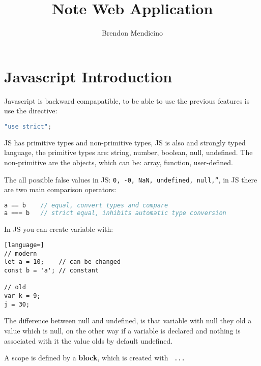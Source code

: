 \documentclass[12pt]{article}
\title{Note Web Application}
\author{Brendon Mendicino}
\begin{document}
\maketitle
\newpage
\tableofcontents
\newpage



\section{Javascript Introduction}
Javascript is backward compapatible, to be able to use the previous features is use the directive:
\begin{lstlisting}[language=javascript]
"use strict";
\end{lstlisting}
JS has primitive types and non-primitive types, JS is also and strongly typed language, the primitive types are: string, number, boolean, null, undefined. The non-primitive are the objects, which can be: array, function, user-defined.

The all possible false values in JS: \texttt{0, -0, NaN, undefined, null,''}, in JS there are two main comparison operators:
\begin{lstlisting}[language=javascript]
a == b    // equal, convert types and compare
a === b   // strict equal, inhibits automatic type conversion
\end{lstlisting}
In JS you can create variable with:
\begin{lstlisting}[language=]
// modern
let a = 10;    // can be changed
const b = 'a'; // constant

// old
var k = 9;
j = 30;
\end{lstlisting}
The difference between null and undefined, is that variable with null they old a value which is null, on the other way if a variable is declared and nothing is associated with it the value olds by default undefined.

A scope is defined by a \textbf{block}, which is created with \texttt{{ ... }}
\end{document}
